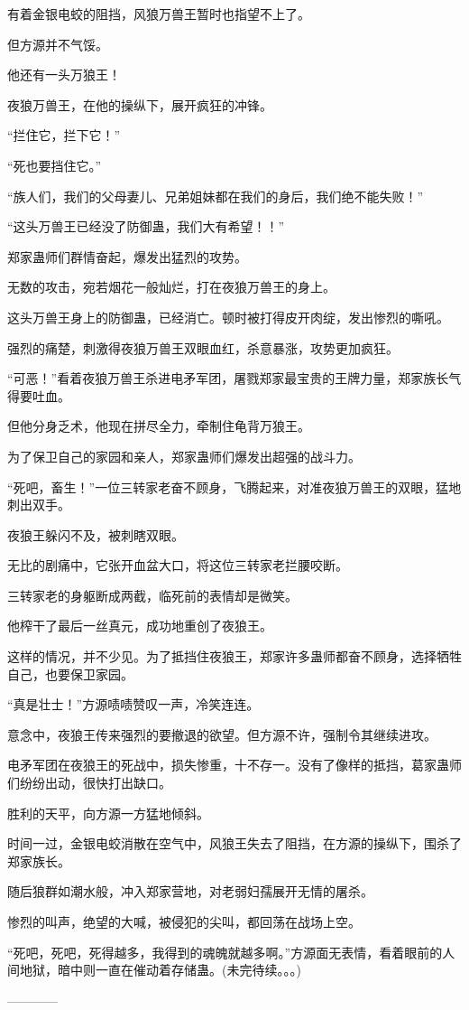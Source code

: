 \begin{this_body}
有着金银电蛟的阻挡，风狼万兽王暂时也指望不上了。

但方源并不气馁。

他还有一头万狼王！

夜狼万兽王，在他的操纵下，展开疯狂的冲锋。

“拦住它，拦下它！”

“死也要挡住它。”

“族人们，我们的父母妻儿、兄弟姐妹都在我们的身后，我们绝不能失败！”

“这头万兽王已经没了防御蛊，我们大有希望！！”

郑家蛊师们群情奋起，爆发出猛烈的攻势。

无数的攻击，宛若烟花一般灿烂，打在夜狼万兽王的身上。

这头万兽王身上的防御蛊，已经消亡。顿时被打得皮开肉绽，发出惨烈的嘶吼。

强烈的痛楚，刺激得夜狼万兽王双眼血红，杀意暴涨，攻势更加疯狂。

“可恶！”看着夜狼万兽王杀进电矛军团，屠戮郑家最宝贵的王牌力量，郑家族长气得要吐血。

但他分身乏术，他现在拼尽全力，牵制住龟背万狼王。

为了保卫自己的家园和亲人，郑家蛊师们爆发出超强的战斗力。

“死吧，畜生！”一位三转家老奋不顾身，飞腾起来，对准夜狼万兽王的双眼，猛地刺出双手。

夜狼王躲闪不及，被刺瞎双眼。

无比的剧痛中，它张开血盆大口，将这位三转家老拦腰咬断。

三转家老的身躯断成两截，临死前的表情却是微笑。

他榨干了最后一丝真元，成功地重创了夜狼王。

这样的情况，并不少见。为了抵挡住夜狼王，郑家许多蛊师都奋不顾身，选择牺牲自己，也要保卫家园。

“真是壮士！”方源啧啧赞叹一声，冷笑连连。

意念中，夜狼王传来强烈的要撤退的欲望。但方源不许，强制令其继续进攻。

电矛军团在夜狼王的死战中，损失惨重，十不存一。没有了像样的抵挡，葛家蛊师们纷纷出动，很快打出缺口。

胜利的天平，向方源一方猛地倾斜。

时间一过，金银电蛟消散在空气中，风狼王失去了阻挡，在方源的操纵下，围杀了郑家族长。

随后狼群如潮水般，冲入郑家营地，对老弱妇孺展开无情的屠杀。

惨烈的叫声，绝望的大喊，被侵犯的尖叫，都回荡在战场上空。

“死吧，死吧，死得越多，我得到的魂魄就越多啊。”方源面无表情，看着眼前的人间地狱，暗中则一直在催动着存储蛊。(未完待续。。。)

------------

\end{this_body}

